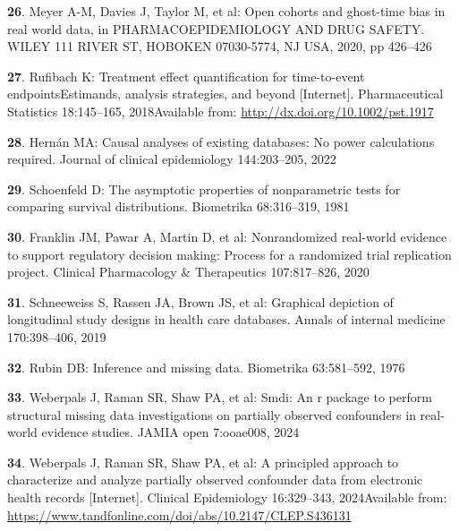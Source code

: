 \documentclass[
  letterpaper,
  DIV=11,
  numbers=noendperiod]{scrartcl}
\newlength{\cslhangindent}
\newenvironment{CSLReferences}[2] %
 {\begin{list}{}{%
  \setlength{\itemindent}{0pt}
  \setlength{\leftmargin}{0pt}
  \setlength{\parsep}{0pt}
  \ifodd #1
   \setlength{\leftmargin}{\cslhangindent}
   \setlength{\itemindent}{-1\cslhangindent}
  \fi
  \setlength{\itemsep}{#2\baselineskip}}}
 {\end{list}}
\begin{document}
\begin{CSLReferences}{0}{1}
\textbf{26}. Meyer A-M, Davies J, Taylor M, et al: Open cohorts and
ghost-time bias in real world data, in PHARMACOEPIDEMIOLOGY AND DRUG
SAFETY. WILEY 111 RIVER ST, HOBOKEN 07030-5774, NJ USA, 2020, pp
426--426

\textbf{27}. Rufibach K: Treatment effect quantification for
time{-}to{-}event endpoints{\textendash}Estimands, analysis strategies,
and beyond {[}Internet{]}. Pharmaceutical Statistics 18:145--165,
2018Available from: \url{http://dx.doi.org/10.1002/pst.1917}

\textbf{28}. Hernán MA: Causal analyses of existing databases: No power
calculations required. Journal of clinical epidemiology 144:203--205,
2022

\textbf{29}. Schoenfeld D: The asymptotic properties of nonparametric
tests for comparing survival distributions. Biometrika 68:316--319, 1981

\textbf{30}. Franklin JM, Pawar A, Martin D, et al: Nonrandomized
real-world evidence to support regulatory decision making: Process for a
randomized trial replication project. Clinical Pharmacology \&
Therapeutics 107:817--826, 2020

\textbf{31}. Schneeweiss S, Rassen JA, Brown JS, et al: Graphical
depiction of longitudinal study designs in health care databases. Annals
of internal medicine 170:398--406, 2019

\textbf{32}. Rubin DB: Inference and missing data. Biometrika
63:581--592, 1976

\textbf{33}. Weberpals J, Raman SR, Shaw PA, et al: Smdi: An r package
to perform structural missing data investigations on partially observed
confounders in real-world evidence studies. JAMIA open 7:ooae008, 2024

\textbf{34}. Weberpals J, Raman SR, Shaw PA, et al: A principled
approach to characterize and analyze partially observed confounder data
from electronic health records {[}Internet{]}. Clinical Epidemiology
16:329--343, 2024Available
from:\href{\%20\%0A\%20\%20\%20\%20\%0A\%20\%20\%20\%20\%0A\%20\%20\%20\%20\%20\%20\%20\%20https://www.tandfonline.com/doi/abs/10.2147/CLEP.S436131\%0A\%20\%20\%20\%20\%0A\%0A}{
https://www.tandfonline.com/doi/abs/10.2147/CLEP.S436131 }


\end{CSLReferences}
\end{document}
